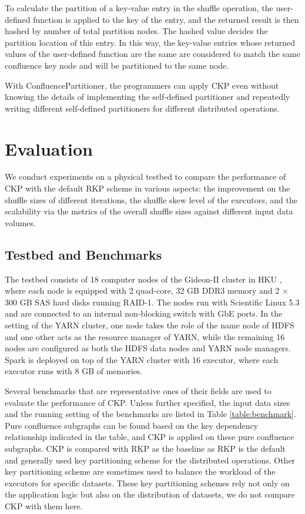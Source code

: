 \documentclass[10pt,journal,compsoc]{IEEEtran}
\begin{document}
To calculate the partition of a key-value entry in the shuffle operation, 
the user-defined function is applied to the key of the entry, 
and the returned result is then hashed by number of total partition nodes. 
The hashed value decides the partition location of this entry. 
In this way, the key-value entries whose returned values of the user-defined function are the same are considered to match the same confluence key node and will be partitioned to the same node.

With ConfluencePartitioner, the programmers can apply CKP even without knowing the details of implementing the self-defined partitioner and repeatedly writing different self-defined partitioners for different distributed operations.


\section{Evaluation}\label{section:evaluation}
We conduct experiments on a physical testbed to compare the performance of CKP with the default RKP scheme in various aspects: the improvement on the shuffle sizes of different iterations, the shuffle skew level of the executors, and the scalability via the metrics of the overall shuffle sizes against different input data volumes. 


\subsection{Testbed and Benchmarks}
The testbed consists of 18 computer nodes of the Gideon-II cluster in HKU \cite{gideon}, where each node is equipped with 2 quad-core, 32 GB DDR3 memory and 2 $\times$ 300 GB SAS hard disks running RAID-1. 
The nodes run with Scientific Linux 5.3 and are connected to an internal non-blocking switch with GbE ports. 
In the setting of the YARN cluster, one node takes the role of  the name node of HDFS and one other acts as the resource manager of YARN, while the remaining 16 nodes are configured as both the HDFS data nodes and YARN node managers. 
Spark is deployed on top of the YARN cluster with 16 executor, where each executor runs with 8 GB of memories. 

Several benchmarks that are representative ones of their fields are used to evaluate the performance of CKP.
Unless further specified, the input data sizes and the running setting of the benchmarks are listed in Table \ref{table:benchmark}.
Pure confluence subgraphs can be found based on the key dependency relationship indicated in the table, and CKP is applied on these pure confluence subgraphs. 
CKP is compared with RKP as the baseline as RKP is the default and generally used key partitioning scheme for the distributed operations. 
Other key partitioning scheme are sometimes used to balance the workload of the executors for specific datasets. 
These key partitioning schemes rely not only on the application logic but also on the distribution of datasets, we do not compare CKP with them here. 
\end{document}
